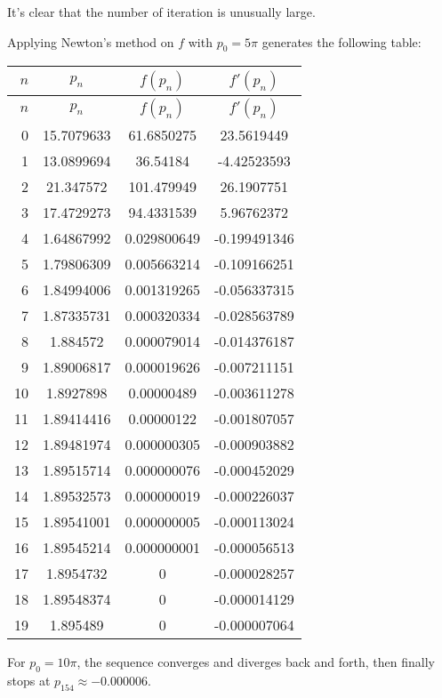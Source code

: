 \documentclass[../../../../Assignments]{subfiles}
\begin{document}
\begin{solution}
    It's clear that the number of iteration is unusually large.

    Applying Newton's method on \(f\) with \(p_0 = 5 \pi\) generates the
    following table:

    \begin{longtable}{r S[table-format=2.8] S[table-format=3.9] S[table-format=-1.9]}
        \toprule
        \(n\)  &   {\(p_n\)}   &   {\(f(p_n)\)}  &  {\(f'(p_n)\)}  \\
        \midrule
        \endfirsthead
        \(n\)  &   {\(p_n\)}   &   {\(f(p_n)\)}  &  {\(f'(p_n)\)}  \\
        \midrule
          &  15.7079633   &   61.6850275    &  23.5619449     \\
            1  &  13.0899694   &   36.54184      &  -4.42523593    \\
            2  &  21.347572    &  101.479949     &  26.1907751     \\
            3  &  17.4729273   &   94.4331539    &   5.96762372    \\
            4  &   1.64867992  &    0.029800649  &  -0.199491346   \\
            5  &   1.79806309  &    0.005663214  &  -0.109166251   \\
            6  &   1.84994006  &    0.001319265  &  -0.056337315   \\
            7  &   1.87335731  &    0.000320334  &  -0.028563789   \\
            8  &   1.884572    &    0.000079014  &  -0.014376187   \\
            9  &   1.89006817  &    0.000019626  &  -0.007211151   \\
           10  &   1.8927898   &    0.00000489   &  -0.003611278   \\
           11  &   1.89414416  &    0.00000122   &  -0.001807057   \\
           12  &   1.89481974  &    0.000000305  &  -0.000903882   \\
           13  &   1.89515714  &    0.000000076  &  -0.000452029   \\
           14  &   1.89532573  &    0.000000019  &  -0.000226037   \\
           15  &   1.89541001  &    0.000000005  &  -0.000113024   \\
           16  &   1.89545214  &    0.000000001  &  -0.000056513   \\
           17  &   1.8954732   &    0            &  -0.000028257   \\
           18  &   1.89548374  &    0            &  -0.000014129   \\
           19  &   1.895489    &    0            &  -0.000007064   \\
        \bottomrule
    \end{longtable}

    For \(p_0 = 10 \pi\), the sequence converges and diverges back and forth,
    then finally stops at \(p_{154} \approx \num{-0.000006}\).
\end{solution}
\end{document}
